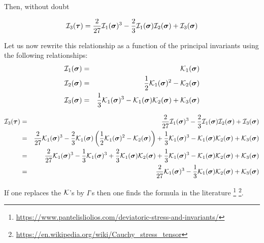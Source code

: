 Then, without doubt

\begin{mdframed}[backgroundcolor=blue!5]
\[
{\cal I}_3(\bm\tau) =
 \frac{2}{27}  {\cal I}_1(\bm\sigma)^3 - \frac23{\cal I}_1(\bm\sigma) {\cal I}_2(\bm\sigma)
+{\cal I}_3(\bm\sigma)
\]
\end{mdframed}


Let us now rewrite this relationship as a function of the principal invariants using the 
following relationships:
\begin{eqnarray}
{\cal I}_1({\bm \sigma})&=& {\cal K}_1({\bm \sigma}) \nonumber\\ 
{\cal I}_2({\bm \sigma})&=& \frac{1}{2}{\cal K}_1({\bm \sigma})^2-{\cal K}_2({\bm \sigma}) \nonumber\\
{\cal I}_3({\bm \sigma})&=& \frac{1}{3}{\cal K}_1({\bm \sigma})^3-{\cal K}_1({\bm \sigma}) \nonumber
{\cal K}_2({\bm \sigma}) +{\cal K}_3({\bm \sigma})
\end{eqnarray}

\begin{eqnarray}
{\cal I}_3(\bm\tau) 
&=& \frac{2}{27} {\cal I}_1(\bm\sigma)^3 
-\frac23 {\cal I}_1(\bm\sigma){\cal I}_2(\bm\sigma) + {\cal I}_3(\bm \sigma) \nonumber\\
&=& \frac{2}{27} {\cal K}_1(\bm\sigma)^3
-\frac23 {\cal K}_1(\bm\sigma)  \left( \frac{1}{2}{\cal K}_1({\bm \sigma})^2 -{\cal K}_2({\bm \sigma}) \right)
+ \frac{1}{3}{\cal K}_1({\bm \sigma})^3 -{\cal K}_1({\bm \sigma}) 
{\cal K}_2({\bm \sigma}) +{\cal K}_3({\bm \sigma}) \nonumber\\
&=& \frac{2}{27} {\cal K}_1(\bm\sigma)^3
-\frac13 {\cal K}_1(\bm\sigma)^3 
+\frac23 {\cal K}_1(\bm\sigma)  {\cal K}_2({\bm \sigma}) 
+ \frac{1}{3}{\cal K}_1({\bm \sigma})^3 -{\cal K}_1({\bm \sigma}) {\cal K}_2({\bm \sigma}) 
+{\cal K}_3({\bm \sigma}) \nonumber\\
&=& \frac{2}{27} {\cal K}_1(\bm\sigma)^3
-\frac13 {\cal K}_1(\bm\sigma)  {\cal K}_2({\bm \sigma}) 
+{\cal K}_3({\bm \sigma}) 
\end{eqnarray}

If one replaces the ${\cal K}$'s by $I$'s then one finds the formula in the literature 
\footnote{\url{https://www.pantelisliolios.com/deviatoric-stress-and-invariants/}}
\footnote{\url{https://en.wikipedia.org/wiki/Cauchy_stress_tensor}}.




